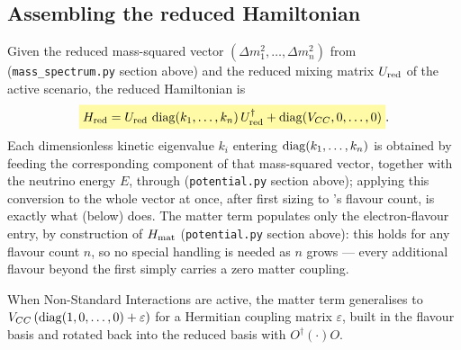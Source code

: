 \begin{theorybox}
\subsection*{Assembling the reduced Hamiltonian}
Given the reduced mass-squared vector $(\Delta m^2_1,\dots,\Delta m^2_n)$
from  (\texttt{mass\_spectrum.py} section above) and
the reduced mixing matrix $U_{\rm red}$ of the active 
scenario, the reduced Hamiltonian is
\begin{equation}
  \keyresult{H_{\rm red} = U_{\rm red}\,\diag(k_1,\dots,k_n)\,U_{\rm red}^{\dagger} + \diag(V_{CC},0,\dots,0)}.
\end{equation}
Each dimensionless kinetic eigenvalue $k_i$ entering $\operatorname{diag}(k_1,\dots,k_n)$
is obtained by feeding the corresponding component of that mass-squared
vector, together with the neutrino energy $E$, through
 (\texttt{potential.py} section above); applying
this conversion to the whole vector at once, after first sizing
 to 's
flavour count, is exactly what  (below)
does.
The matter term populates only the electron-flavour entry, by construction
of $H_{\rm mat}$ (\texttt{potential.py} section above): this holds for any
flavour count $n$, so no special handling is needed as $n$ grows --- every
additional flavour beyond the first simply carries a zero matter coupling.

When Non-Standard Interactions are active, the matter term
generalises to $V_{CC}\,(\operatorname{diag}(1,0,\dots,0)+\varepsilon)$ for a Hermitian
coupling matrix $\varepsilon$, built in the flavour basis and rotated back
into the reduced basis with $O^\dagger(\cdot)O$.


\end{theorybox}

